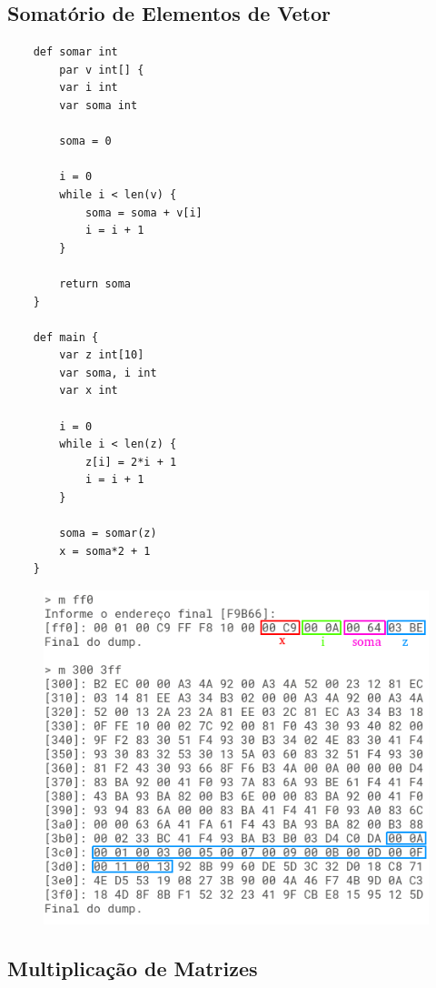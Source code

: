 \documentclass[a4paper,12pt]{report}
\begin{document}
    \subsection*{Somatório de Elementos de Vetor}

    \begin{lstlisting}
    def somar int
        par v int[] {
        var i int
        var soma int

        soma = 0
        
        i = 0
        while i < len(v) {
            soma = soma + v[i]
            i = i + 1
        }
        
        return soma
    }

    def main {
        var z int[10]
        var soma, i int
        var x int
        
        i = 0
        while i < len(z) {
            z[i] = 2*i + 1
            i = i + 1
        }
        
        soma = somar(z)
        x = soma*2 + 1
    }
    \end{lstlisting}

    \begin{figure}[h]
        \centering
        \includegraphics[scale=0.7]{soma_vetor}
    \end{figure}

    \subsection*{Multiplicação de Matrizes}
\end{document}
